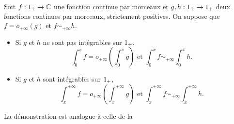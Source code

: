 \begin{prop}{}
    Soit $f: 1_+ \rightarrow \mathbb{C}$ une fonction continue par morceaux et $g, h:1_+ \rightarrow 1_+$ deux fonctions continues par morceaux, strictement positives. On suppose que $f = o_{+\infty}(g)$ et $f \sim_{+\infty} h$.\\
    \begin{itemize}
        \item Si $g$ et $h$ ne sont pas intégrables sur $1_+$,
        $$\int_{0}^{x} f = o_{+\infty} \left(\int_{0}^{x} g \right) \text{ et } \int_{0}^{x} f \sim_{+\infty} \int_{0}^{x} h.$$
        \item Si $g$ et $h$ sont intégrables sur $1_+$,
        $$\int_{x}^{+\infty} f = o_{+\infty} \left(\int_{x}^{+\infty} g \right) \text{ et } \int_{x}^{+\infty} f \sim_{+\infty} \int_{x}^{+\infty} h.$$
    \end{itemize}
\end{prop} 

La démonstration est analogue à celle de la 

